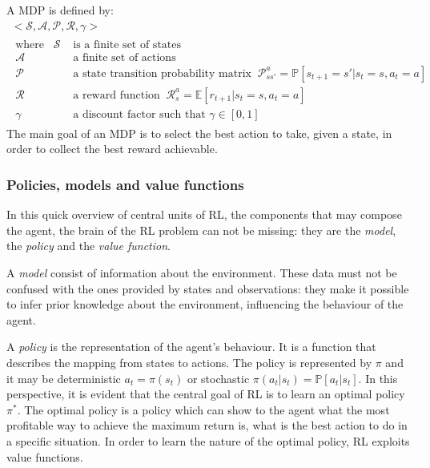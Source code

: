 A MDP is defined by:
 \begin{equation}\label{eq:mdp}
 \begin{gathered} 
 <\mathcal{S}, \mathcal{A}, \mathcal{P}, \mathcal{R}, \gamma>\\
 \begin{aligned}
 	\text{where}\hspace{10pt} \mathcal{S} & \text{ is a finite set of states} \\
 	\mathcal{A} & \text{ a finite set of actions} \\
 	\mathcal{P} & \text{ a state transition probability matrix}\;\;
 	 \mathcal{P}_{ss'}^a = \mathbb{P}[s_{t+1}= s' | s_t = s, a_t = a]\\
 	\mathcal{R} & \text{ a reward function}
 	 	\;\; \mathcal{R}_{s}^a = \mathbb{E}[r_{t+1} | s_t = s, a_t = a] \\
 	 \gamma & \text{ a discount factor such that } \gamma \in [0,1]
 \end{aligned}
 \end{gathered}
 \end{equation}
The main goal of an MDP is to select the best action to take, given a state, in order to collect the best reward achievable. 

\subsubsection{Policies, models and value functions} \label{pmvf}
In this quick overview of central units of RL, the components that may compose the agent, the brain of the RL problem can not be missing: they are the \textit{model}, the \textit{policy} and the \textit{value function}.

A \textit{model} consist of information about the environment. These data must not be confused with the ones provided by states and observations: they make it possible to infer prior knowledge about the environment, influencing the behaviour of the agent.

A \textit{policy} is the representation of the agent's behaviour. It is a function that describes the mapping from states to actions.  The policy is represented by $\pi$ and it may be deterministic  $a_t = \pi(s_t)$  or stochastic $\pi(a_t|s_t) = \mathbb{P}[a_t | s_t]$.
In this perspective, it is evident that the central goal of RL is to learn an optimal policy $\pi^*$. The optimal policy is a policy which can show to the agent what the most profitable way to achieve the maximum return is, what is the best action to do in a specific situation. In order to learn the nature of the optimal policy, RL exploits value functions.

